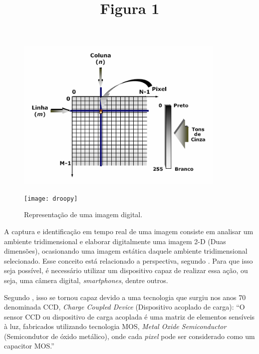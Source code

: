 \title{Figura 1} 
\date{} %
\maketitle
\begin{figure}[h]
\caption{ {\footnotesize Representação de uma imagem digital.}}
 
\centering %
\includegraphics[width=10cm]{revisao-bibliografica/Figuras/matriz-imagem.png} %
\label{figura:figura1}

\centering {}
{
\texttt{[image: droopy]}
\label{figura:figura1}
}
\end{figure}

 


A captura e identificação em tempo real de uma imagem consiste em analisar um ambiente tridimensional e elaborar digitalmente uma imagem 2-D (Duas dimensões), ocasionando uma imagem estática daquele ambiente tridimensional selecionado. Esse conceito está relacionado a perspectiva, segundo . Para que isso seja possível, é necessário utilizar um dispositivo capaz de realizar essa ação, ou seja, uma câmera digital, \textit{smartphones}, dentre outros.

Segundo , isso se tornou capaz devido a uma tecnologia que surgiu nos anos 70 denominada CCD, \textit{Charge Coupled Device} (Dispositivo acoplado de carga): “O sensor CCD ou dispositivo de carga acoplada é uma matriz de elementos sensíveis à luz, fabricados utilizando tecnologia MOS, \textit{Metal Oxide Semiconductor} (Semicondutor de óxido metálico), onde cada \textit{pixel} pode ser considerado como um capacitor MOS.”

